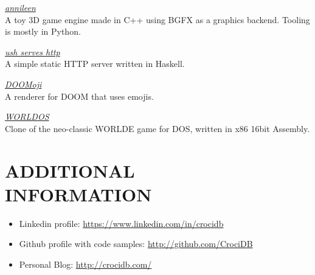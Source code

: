 \documentclass[line,margin]{res}
\begin{document}
\begin{resume}
        {\sl \href{https://github.com/CrociDB/annileen}{annileen} } \\
            A toy 3D game engine made in C++ using BGFX as a graphics backend. Tooling is mostly in Python.

        {\sl \href{https://github.com/CrociDB/ush}{ush serves http} } \\
            A simple static HTTP server written in Haskell.

        {\sl \href{https://github.com/CrociDB/doomoji}{DOOMoji} } \\
            A renderer for DOOM that uses emojis. 

        {\sl \href{https://github.com/CrociDB/wordlos}{WORLDOS} } \\
            Clone of the neo-classic WORLDE game for DOS, written in x86 16bit Assembly.


\section{ADDITIONAL \\ INFORMATION}
        \begin{itemize}  \itemsep 1pt
                \item Linkedin profile: \href{https://www.linkedin.com/in/crocidb}{https://www.linkedin.com/in/crocidb}
                \item Github profile with code samples: \href{http://github.com/CrociDB}{http://github.com/CrociDB}
                \item Personal Blog: \href{http://crocidb.com/}{http://crocidb.com/}
        \end{itemize} 

\end{resume}
\end{document}
